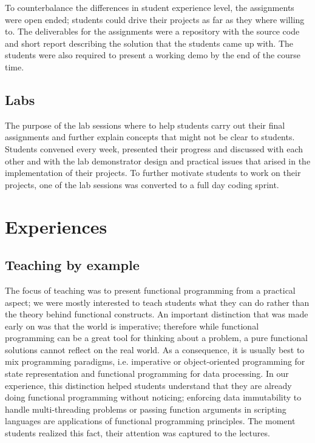 \documentclass[conference]{IEEEtran}
\begin{document}
To counterbalance the differences in student experience level, 
the assignments were open ended; students could drive their projects as
far as they where willing to.
The deliverables for the assignments were a repository
with the source code and short report describing the solution that the
students came up with. The students were also required to present a working
demo by the end of the course time. 

\subsection{Labs}

The purpose of the lab sessions where to help students carry out their final
assignments and further explain concepts that might not be clear to students. 
Students convened every week, presented their progress and discussed with 
each other and with the lab demonstrator design and practical issues that
arised in the implementation of their projects. To further motivate students
to work on their projects, one of the lab sessions was converted to a full
day coding sprint.

\section{Experiences}

\subsection{Teaching by example}

The focus of teaching was to present functional programming from a practical
aspect; we were mostly interested to teach students what they can do rather than
the theory behind functional constructs. An important distinction that was made
early on was that the world is imperative; therefore while functional
programming can be a great tool for thinking about a problem, a pure functional
solutions cannot reflect on the real world. As a consequence, it is usually best
to mix programming paradigms, i.e. imperative or object-oriented programming for
state representation and functional programming for data processing. In our
experience, this distinction helped students understand that they are already
doing functional programming without noticing; enforcing data immutability to
handle multi-threading problems or passing function arguments in scripting
languages are applications of functional programming principles. The moment
students realized this fact, their attention was captured to the lectures.
\end{document}
